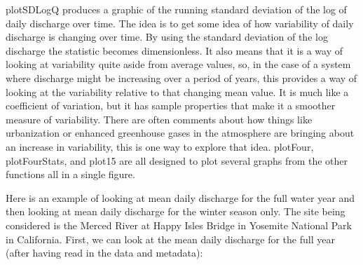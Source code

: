 \documentclass[a4paper,11pt]{article}\usepackage{graphicx, color}
\begin{document}
plotSDLogQ produces a graphic of the running standard deviation of the log of daily discharge over time.  The idea is to get some idea of how variability of daily discharge is changing over time.  By using the standard deviation of the log discharge the statistic becomes dimensionless.  It also means that it is a way of looking at variability quite aside from average values, so, in the case of a system where discharge might be increasing over a period of years, this provides a way of looking at the variability relative to that changing mean value.  It is much like a coefficient of variation, but it has sample properties that make it a smoother measure of variability.  There are often comments about how things like urbanization or enhanced greenhouse gases in the atmosphere are bringing about an increase in variability, this is one way to explore that idea. plotFour, plotFourStats, and plot15 are all designed to plot several graphs from the other functions all in a single figure. 

Here is an example of looking at mean daily discharge for the full water year and then looking at mean daily discharge for the winter season only.  The site being considered is the Merced River at Happy Isles Bridge in Yosemite National Park in California.  First, we can look at the mean daily discharge for the full year (after having read in the data and metadata):
\end{document}
